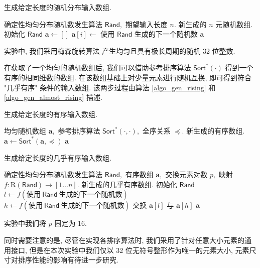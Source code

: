 \documentclass[12pt]{article}
\begin{document}
\begin{algorithm}
\caption{生成给定长度的随机分布输入数组.}
\label{algo_gen_rand}
\begin{algorithmic}[1]
\Require 确定性均匀分布随机数发生算法 $\mathsf{Rand},$ 期望输入长度 $n.$
\Ensure 新生成的 $n$ 元随机数组.
\State 初始化 $\mathsf{Rand}$
\State $\bm{a} \gets []$
    \State $\bm{a}[i] \gets$ 使用 $\mathsf{Rand}$ 生成的下一个随机数
\EndFor
\State \Return $\bm{a}$
\end{algorithmic}
\end{algorithm}

实验中, 我们采用梅森旋转算法 \cite{bib_mersenne_randgen} 产生均匀且具有极长周期的随机 32 位整数.

在获取了一个均匀的随机数组后, 我们可以借助参考排序算法 $\mathsf{Sort}^*(\cdot)$ 得到一个有序的相同维数的数组. 在该数组基础上对少量元素进行随机互换, 即可得到符合 "几乎有序" 条件的输入数组. 该两步过程由算法 \ref{algo_gen_rising} 和 \ref{algo_gen_almost_rising} 描述.

\begin{algorithm}
\caption{生成给定长度的有序输入数组.}
\label{algo_gen_rising}
\begin{algorithmic}[1]
\Require 均匀随机数组 $\bm{a},$ 参考排序算法 $\mathsf{Sort}^*(\cdot, \cdot),$ 全序关系 $\preceq.$
\Ensure 新生成的有序数组.
\State $\bm{a} \gets \mathsf{Sort}^*(\bm{a}, \preceq)$
\State \Return $\bm{a}$
\end{algorithmic}
\end{algorithm}

\begin{algorithm}
\caption{生成给定长度的几乎有序输入数组.}
\label{algo_gen_almost_rising}
\begin{algorithmic}[1]
\Require 确定性均匀分布随机数发生算法 $\mathsf{Rand},$ 有序数组 $\bm{a},$ 交换元素对数 $p,$ 映射 $f: \mathrm{R}(\mathsf{Rand}) \to [1 \dots n].$
\Ensure 新生成的几乎有序数组.
\State 初始化 $\mathsf{Rand}$
    \State $l \gets f(\text{使用}\ \mathsf{Rand}\ \text{生成的下一个随机数})$
    \State $h \gets f(\text{使用}\ \mathsf{Rand}\ \text{生成的下一个随机数})$
    \State 交换 $\bm{a}[l]$ 与 $\bm{a}[h]$
\EndFor
\State \Return $\bm{a}$
\end{algorithmic}
\end{algorithm}

实验中我们将 $p$ 固定为 16.

同时需要注意的是, 尽管在实现各排序算法时, 我们采用了针对任意大小元素的通用接口, 但是在本次实验中我们仅以 32 位无符号整形作为唯一的元素大小, 元素尺寸对排序性能的影响有待进一步研究.
\end{document}
